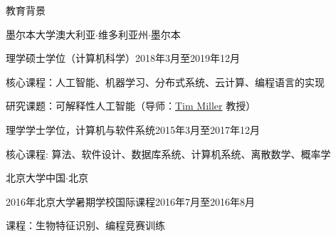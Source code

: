 \documentclass{xsha}
\begin{document}
\address{
\textbf{电话号码} +86 136******** $\cdot$\space
\textbf{电子邮箱} \href{mailto:luo@jiahai.co}{luo@jiahai.co} $\cdot$\space
\textbf{领英} \href{https://linkedin.com/in/luojiahai/}{in/luojiahai} $\cdot$\space
\textbf{GitHub} \href{https://github.com/luojiahai/}{luojiahai} $\cdot$\space
\textbf{个人网站} \href{https://luojiahai.com/}{luojiahai.com}
}

\begin{xsection}{教育背景}

\begin{xheading}{墨尔本大学}{澳大利亚$\cdot$维多利亚州$\cdot$墨尔本}
\begin{xsubheading}{理学硕士学位（计算机科学）}{2018年3月至2019年12月}
\item 核心课程：人工智能、机器学习、分布式系统、云计算、编程语言的实现
\item 研究课题：可解释性人工智能（导师：\href{https://eecs.uq.edu.au/profile/9477/tim-miller}{Tim Miller} 教授）
\end{xsubheading}
\begin{xsubheading}{理学学士学位，计算机与软件系统}{2015年3月至2017年12月}
\item 核心课程: 算法、软件设计、数据库系统、计算机系统、离散数学、概率学
\end{xsubheading}
\end{xheading}

\begin{xheading}{北京大学}{中国$\cdot$北京}
\begin{xsubheading}{2016年北京大学暑期学校国际课程}{2016年7月至2016年8月}
\item 课程：生物特征识别、编程竞赛训练
\end{xsubheading}
\end{xheading}

\end{xsection}
\end{document}
